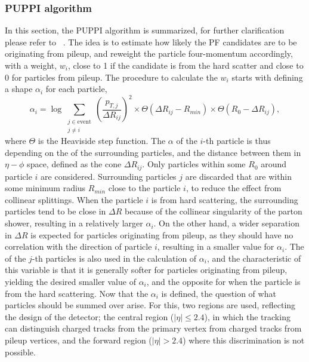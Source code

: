 \subsubsection{PUPPI algorithm}
In this section, the PUPPI algorithm is summarized, for further clarification please refer to ~\cite{Bertolini:2014bba}. 
The idea is to estimate how likely the PF candidates are to be originating from pileup, and reweight the particle four-momentum accordingly, with a weight, $w_{i}$, close to 1 if the candidate is from the hard scatter and close to 0 for particles from pileup. 
The procedure to calculate the $w_{i}$ starts with defining a shape $\alpha_{i}$ for each particle, 
\begin{equation}
  \alpha_i = \log \sum_{\substack{j \in \text{event} \\ j \neq i}} \left(\frac{p_{T, j}}{\Delta R_{ij}}\right)^{2} \times \Theta(\Delta R_{ij}-R_{min})\times \Theta(R_{0}-\Delta R_{ij}),
\end{equation}
where $\Theta$ is the Heaviside step function. 
The $\alpha$ of the $i$-th particle is thus depending on the \pt of the surrounding particles, and the distance between them in $\eta-\phi$ space, defined as the cone $\Delta R_{ij}$.
Only particles within some $R_{0}$ around particle $i$ are considered. 
Surrounding particles $j$ are discarded that are within some minimum radius $R_{min}$ close to the particle $i$, to reduce the effect from collinear splittings. 
When the particle $i$ is from hard scattering, the surrounding particles tend to be close in $\Delta R$ because of the collinear singularity of the parton shower, resulting in a relatively larger $\alpha_{i}$. 
On the other hand, a wider separation in $\Delta R$ is expected for particles originating from pileup, as they should have no correlation with the direction of particle $i$, resulting in a smaller value for $\alpha_{i}$. 
The \pt of the $j$-th particles is also used in the calculation of $\alpha_{i}$, and the characteristic of this variable is that it is generally softer for particles originating from pileup, yielding the desired smaller value of $\alpha_{i}$, and the opposite for when the particle is from the hard scattering. 
Now that the $\alpha_{i}$ is defined, the question of what particles should be summed over arise. 
For this, two regions are used, reflecting the design of the detector; the central region ($|\eta|\leq2.4$), in which the tracking can distinguish charged tracks from the primary vertex from charged tracks from pileup vertices, and the forward region ($|\eta|>2.4$) where this discrimination is not possible.
